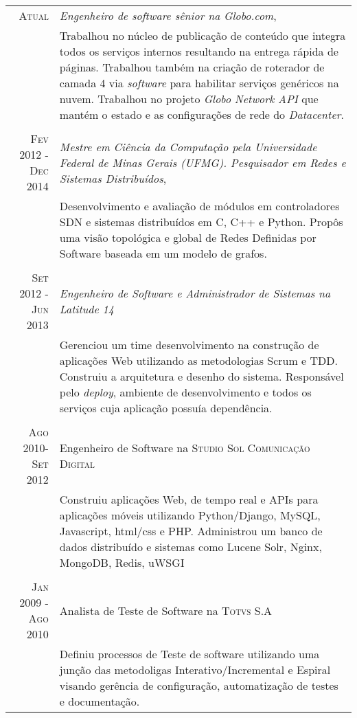 \documentclass[a4paper,10pt]{article} %
\begin{document}
\begin{tabular}{r|p{11cm}}

\textsc{Atual} & \emph{Engenheiro de software sênior na Globo.com}, \\
& \footnotesize{Trabalhou no núcleo de publicação de conteúdo que integra
todos os serviços internos resultando na entrega rápida de páginas.
Trabalhou também na criação de roterador de camada 4 via \emph{software} para
habilitar serviços genéricos na nuvem. Trabalhou no projeto
\emph{Globo Network API} que mantém o estado e as configurações de rede do
\emph{Datacenter}.} \\
\multicolumn{2}{c}{} \\

\textsc{Fev 2012 - Dec 2014} & \emph{ Mestre em Ciência da Computação pela
    Universidade Federal de Minas Gerais (UFMG). Pesquisador em
Redes e Sistemas Distribuídos}, \\
& \footnotesize{Desenvolvimento e avaliação de módulos em controladores SDN
e sistemas distribuídos em C, C++ e Python. Propôs uma visão topológica e
global de Redes Definidas por Software baseada em um modelo de grafos.} \\
\multicolumn{2}{c}{} \\

\textsc{Set 2012 - Jun 2013} & \emph{Engenheiro de Software e Administrador
de Sistemas na Latitude 14} \\
& \footnotesize{Gerenciou um time desenvolvimento na construção de
aplicações Web utilizando as metodologias Scrum e TDD.
Construiu a arquitetura e desenho do sistema.
Responsável pelo \emph{deploy}, ambiente de desenvolvimento e todos
os serviços cuja aplicação possuía dependência. } \\
\multicolumn{2}{c}{} \\


\textsc{Ago 2010-Set 2012} & Engenheiro de Software na \textsc{Studio Sol
Comunicação Digital}  \\
& \footnotesize{Construiu aplicações Web, de tempo real e
APIs para aplicações móveis utilizando Python/Django, MySQL,
Javascript, html/css e PHP.
Administrou um banco de dados distribuído e sistemas como
Lucene Solr, Nginx, MongoDB, Redis, uWSGI}\\
\multicolumn{2}{c}{} \\


\textsc{Jan 2009 - Ago 2010} & Analista de Teste de Software
na \textsc{Totvs S.A} \\
& \footnotesize{Definiu processos de Teste de software utilizando uma
junção das metodoligas Interativo/Incremental e Espiral visando
gerência de configuração, automatização de testes e documentação.}
\end{tabular}
\end{document}
